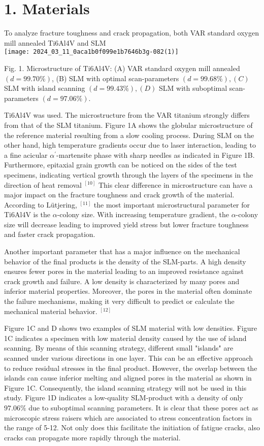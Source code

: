 \documentclass[10pt]{article}
\begin{document}
\section*{1. Materials}
To analyze fracture toughness and crack propagation, both VAR standard oxygen mill annealed Ti6Al4V and SLM\\
\texttt{[image: 2024\_03\_11\_0aca1b0f099e1b7646b3g-082(1)]}

Fig. 1. Microstructure of Ti6Al4V: (A) VAR standard oxygen mill annealed $(d=99.70 \%)$, (B) SLM with optimal scan-parameters $(d=99.68 \%),(C)$ SLM with island scanning $(d=99.43 \%),(D)$ SLM with suboptimal scan-parameters $(d=97.06 \%)$.

Ti6Al4V was used. The microstructure from the VAR titanium strongly differs from that of the SLM titanium. Figure 1A shows the globular microstructure of the reference material resulting from a slow cooling process. During SLM on the other hand, high temperature gradients occur due to laser interaction, leading to a fine acicular $\alpha^{\prime}$-martensite phase with sharp needles as indicated in Figure 1B. Furthermore, epitaxial grain growth can be noticed on the sides of the test specimens, indicating vertical growth through the layers of the specimens in the direction of heat removal ${ }^{[10]}$ This clear difference in microstructure can have a major impact on the fracture toughness and crack growth of the material. According to Lütjering, ${ }^{[11]}$ the most important microstructural parameter for Ti6Al4V is the $\alpha$-colony size. With increasing temperature gradient, the $\alpha$-colony size will decrease leading to improved yield stress but lower fracture toughness and faster crack propagation.

Another important parameter that has a major influence on the mechanical behavior of the final products is the density of the SLM-parts. A high density ensures fewer pores in the material leading to an improved resistance against crack growth and failure. A low density is characterized by many pores and inferior material properties. Moreover, the pores in the material often dominate the failure mechanisms, making it very difficult to predict or calculate the mechanical material behavior. ${ }^{[12]}$

Figure 1C and D shows two examples of SLM material with low densities. Figure 1C indicates a specimen with low material density caused by the use of island scanning. By means of this scanning strategy, different small "islands" are scanned under various directions in one layer. This can be an effective approach to reduce residual stresses in the final product. However, the overlap between the islands can cause inferior melting and aligned pores in the material as shown in Figure 1C. Consequently, the island scanning strategy will not be used in this study. Figure 1D indicates a low-quality SLM-product with a density of only $97.06 \%$ due to suboptimal scanning parameters. It is clear that these pores act as microscopic stress raisers which are associated to stress concentration factors in the range of 5-12. Not only does this facilitate the initiation of fatigue cracks, also cracks can propagate more rapidly through the material.
\end{document}

